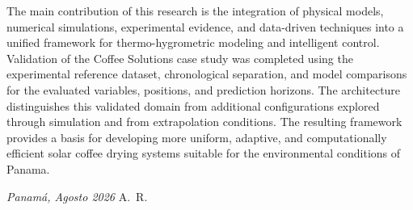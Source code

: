 The main contribution of this research is the integration of physical models, numerical simulations, experimental evidence, and data-driven techniques into a unified framework for thermo-hygrometric modeling and intelligent control. Validation of the Coffee Solutions case study was completed using the experimental reference dataset, chronological separation, and model comparisons for the evaluated variables, positions, and prediction horizons. The architecture distinguishes this validated domain from additional configurations explored through simulation and from extrapolation conditions. The resulting framework provides a basis for developing more uniform, adaptive, and computationally efficient solar coffee drying systems suitable for the environmental conditions of Panama.


\bigskip
 
\noindent\textit{Panamá, Agosto 2026}
\hfill A.~R.

